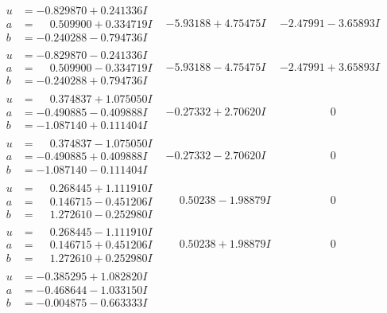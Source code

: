 \documentclass[1p]{elsarticle_modified}
\theoremstyle{definition}
\begin{document}
$$\begin{array}{c|c|c}
\begin{aligned}
u &= -0.829870 + 0.241336 I \\
a &= \phantom{-}0.509900 + 0.334719 I \\
b &= -0.240288 - 0.794736 I\end{aligned}
 & -5.93188 + 4.75475 I & -2.47991 - 3.65893 I \\ \hline\begin{aligned}
u &= -0.829870 - 0.241336 I \\
a &= \phantom{-}0.509900 - 0.334719 I \\
b &= -0.240288 + 0.794736 I\end{aligned}
 & -5.93188 - 4.75475 I & -2.47991 + 3.65893 I \\ \hline\begin{aligned}
u &= \phantom{-}0.374837 + 1.075050 I \\
a &= -0.490885 - 0.409888 I \\
b &= -1.087140 + 0.111404 I\end{aligned}
 & -0.27332 + 2.70620 I & \phantom{-0.000000 } 0 \\ \hline\begin{aligned}
u &= \phantom{-}0.374837 - 1.075050 I \\
a &= -0.490885 + 0.409888 I \\
b &= -1.087140 - 0.111404 I\end{aligned}
 & -0.27332 - 2.70620 I & \phantom{-0.000000 } 0 \\ \hline\begin{aligned}
u &= \phantom{-}0.268445 + 1.111910 I \\
a &= \phantom{-}0.146715 - 0.451206 I \\
b &= \phantom{-}1.272610 - 0.252980 I\end{aligned}
 & \phantom{-}0.50238 - 1.98879 I & \phantom{-0.000000 } 0 \\ \hline\begin{aligned}
u &= \phantom{-}0.268445 - 1.111910 I \\
a &= \phantom{-}0.146715 + 0.451206 I \\
b &= \phantom{-}1.272610 + 0.252980 I\end{aligned}
 & \phantom{-}0.50238 + 1.98879 I & \phantom{-0.000000 } 0 \\ \hline\begin{aligned}
u &= -0.385295 + 1.082820 I \\
a &= -0.468644 - 1.033150 I \\
b &= -0.004875 - 0.663333 I\end{aligned}

\end{array}$$
\end{document}
